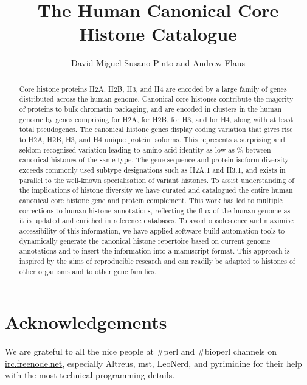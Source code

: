 \documentclass[10pt,a4paper,onecolumn,article,draft]{memoir}
\author{David Miguel Susano Pinto and Andrew Flaus}
\title{The Human Canonical Core Histone Catalogue}
\begin{document}
  \maketitle

  \begin{abstract}
    Core histone proteins H2A, H2B, H3, and H4 are encoded
    by a large family of genes distributed across the human genome.
    Canonical core histones contribute the majority of proteins to bulk
    chromatin packaging,
    and are encoded in \NumberOfClusters{} clusters in the human genome
    by \TotalCodingGenes{} genes comprising
    \HTwoACodingGenes{} for H2A,
    \HTwoBCodingGenes{} for H2B,
    \HThreeCodingGenes{} for H3,
    and \HFourCodingGenes{} for H4,
    along with at least \TotalPseudoGenes{} total pseudogenes.
    The canonical histone genes display coding variation that gives rise to
    \HTwoAUniqueProteins{} H2A, \HTwoBUniqueProteins{} H2B,
    \HThreeUniqueProteins{} H3, and \HFourUniqueProteins{} H4 unique protein isoforms.
    This represents a surprising and seldom recognised variation
    leading to amino acid identity as low as
     \result{}\%
    between canonical histones of the same type.
    The gene sequence and protein isoform diversity
    exceeds commonly used subtype designations such as H2A.1 and H3.1,
    and exists in parallel to the well-known specialisation of variant histones.
    To assist understanding of the implications of histone diversity
    we have curated and catalogued the entire human canonical core
    histone gene and protein complement.
    This work has led to multiple corrections to human histone annotations,
    reflecting the flux of the human genome as it is updated and
    enriched in reference databases.
    To avoid obsolescence and maximise accessibility of this information,
    we have applied software build automation tools to
    dynamically generate the canonical histone repertoire
    based on current genome annotations and to insert the information
    into a manuscript format.
    This approach is inspired by the aims of reproducible research
    and can readily be adapted to histones of other organisms and
    to other gene families.
  \end{abstract}

  
  
  
  
  
  
  

  \section{Acknowledgements}
    We are grateful to all the nice people at \#perl and \#bioperl channels on
    \url{irc.freenode.net}, especially Altreus, mst, LeoNerd, and pyrimidine for
    their help with the most technical programming details.

  

  \newpage
  \appendix
  
\end{document}
